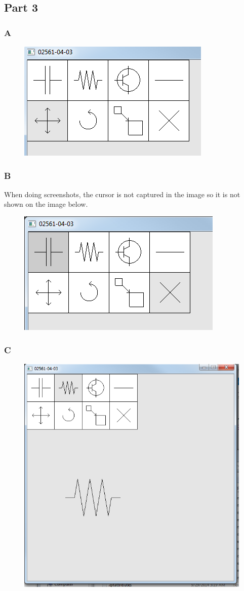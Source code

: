 \documentclass[11pt]{article}
\begin{document}
\subsection{Part 3}
\subsubsection{A}
\begin{figure}[H]
	\centering
	\includegraphics[width=0.5\linewidth]{images/e05p3a}
	\label{fig:e05p3a}
\end{figure}

\subsubsection{B}
When doing screenshots, the cursor is not captured in the image so it is not shown on the image below.
\begin{figure}[H]
	\centering
	\includegraphics[width=0.5\linewidth]{images/e05p3b}
	\label{fig:e05p3b}
\end{figure}

\subsubsection{C}
\begin{figure}[H]
	\centering
	\includegraphics[width=0.5\linewidth]{images/e05p3c}
	\label{fig:e05p3c}
\end{figure}
\end{document}
